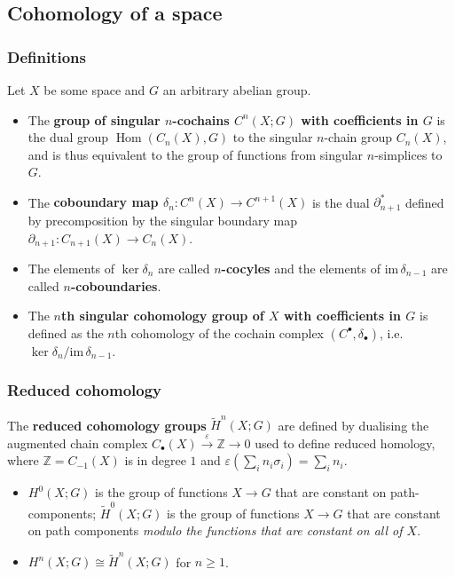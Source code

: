 \documentclass[10pt]{article}
\newcommand{\zz}{\mathbb{Z}}
\newcommand{\im}{\mathrm{im}\,}
\newcommand{\reduced}[1]{\widetilde{#1}}
\DeclareMathOperator{\Hom}{Hom}
\begin{document}
        \subsection{Cohomology of a space}

            \subsubsection{Definitions}

                Let $X$ be some space and $G$ an arbitrary abelian group.

                \begin{itemize}
                    \item The \textbf{group of singular $n$-cochains $C^n(X;G)$ with coefficients in $G$} is the dual group $\Hom(C_n(X),G)$ to the singular $n$-chain group $C_n(X)$, and is thus equivalent to the group of functions from singular $n$-simplices to $G$.
                    \item The \textbf{coboundary map $\delta_n\colon C^n(X)\to C^{n+1}(X)$} is the dual $\partial_{n+1}^*$ defined by precomposition by the singular boundary map $\partial_{n+1}\colon C_{n+1}(X)\to C_n(X)$.
                    \item The elements of $\ker\delta_n$ are called \textbf{$n$-cocyles} and the elements of $\im\delta_{n-1}$ are called \textbf{$n$-coboundaries}.
                    \item The \textbf{$n$th singular cohomology group of $X$ with coefficients in $G$} is defined as the $n$th cohomology of the cochain complex $(C^\bullet,\delta_\bullet)$, i.e. $\ker\delta_n/\im\delta_{n-1}$.
                \end{itemize}

            \subsubsection{Reduced cohomology}

                The \textbf{reduced cohomology groups} $\reduced{H}^n(X;G)$ are defined by dualising the augmented chain complex $C_\bullet(X)\xrightarrow{\varepsilon}\zz\to0$ used to define reduced homology, where $\zz=C_{-1}(X)$ is in degree $1$ and $\varepsilon\left(\sum_i n_i\sigma_i\right)=\sum_i n_i$.

                \begin{itemize}
                    \item $H^0(X;G)$ is the group of functions $X\to G$ that are constant on path-components; $\reduced{H}^0(X;G)$ is the group of functions $X\to G$ that are constant on path components \emph{modulo the functions that are constant on all of $X$}.
                    \item $H^n(X;G)\cong\reduced{H}^n(X;G)$ for $n\geqslant1$.
                \end{itemize}
\end{document}
